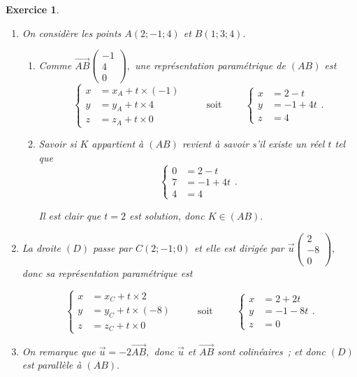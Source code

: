 \documentclass[10pt]{article}
\newtheorem{exo}{Exercice}
\begin{document}
\begin{exo}


\begin{enumerate}
\item On considère les points $A(2;-1;4)$ et $B(1;3;4).$
\begin{enumerate}
\item Comme $\overrightarrow{AB}\begin{pmatrix}-1\\ 4\\ 0\end{pmatrix},$ une représentation paramétrique de $(AB)$ est
\[\begin{cases}x&=x_A+t\times (-1)\\y&=y_A+t\times 4\\z&=z_A+t\times 0\end{cases}\hspace{1cm}\text{soit}\hspace{1cm}\begin{cases}x&=2-t\\y&=-1+4t\\z&=4\end{cases}.\]

\item Savoir si $K$ appartient à $(AB)$ revient à savoir s'il existe un réel $t$ tel que \[\begin{cases}0&=2-t\\7&=-1+4t\\4&=4\end{cases}.\]

Il est clair que $t=2$ est solution, donc $K\in (AB).$
\end{enumerate}
\item La droite $(D)$ passe par $C\left(2;-1;0\right)$ et elle est  dirigée par $\overrightarrow{u}\begin{pmatrix}2\\-8\\0\end{pmatrix},$ donc sa représentation paramétrique est

\[\begin{cases}x&=x_C+t\times 2\\y&=y_C+t\times (-8)\\z&=z_C+t\times 0\end{cases}\hspace{1cm}\text{soit}\hspace{1cm}\begin{cases}x&=2+2t\\y&=-1-8t\\z&=0\end{cases}.\]

\item On remarque que $\overrightarrow{u}=-2\overrightarrow{AB},$ donc $\overrightarrow{u}$ et $\overrightarrow{AB}$ sont colinéaires~; et donc $(D)$ est parallèle à $(AB).$
\end{enumerate}

\end{exo}
\end{document}
